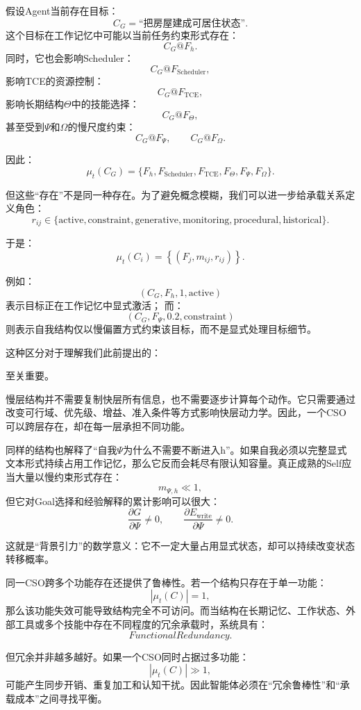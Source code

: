 假设Agent当前存在目标：
\[
C_G=\text{“把房屋建成可居住状态”}.
\]
这个目标在工作记忆中可能以当前任务约束形式存在：
\[
C_G@F_h.
\]
同时，它也会影响Scheduler：
\[
C_G@F_{\text{Scheduler}},
\]
影响TCE的资源控制：
\[
C_G@F_{\text{TCE}},
\]
影响长期结构$\Theta$中的技能选择：
\[
C_G@F_\Theta,
\]
甚至受到$\Psi$和$\Omega$的慢尺度约束：
\[
C_G@F_\Psi,
\qquad
C_G@F_\Omega.
\]

因此：
\[
\mu_t(C_G)
=
\{
F_h,
F_{\text{Scheduler}},
F_{\text{TCE}},
F_\Theta,
F_\Psi,
F_\Omega
\}.
\]

但这些“存在”不是同一种存在。为了避免概念模糊，我们可以进一步给承载关系定义角色：
\[
r_{ij}
\in
\{
\text{active},
\text{constraint},
\text{generative},
\text{monitoring},
\text{procedural},
\text{historical}
\}.
\]

于是：
\[
\mu_t(C_i)
=
\left\{
(F_j,m_{ij},r_{ij})
\right\}.
\]

例如：
\[
(C_G,F_h,1,\text{active})
\]
表示目标正在工作记忆中显式激活；
而：
\[
(C_G,F_\Psi,0.2,\text{constraint})
\]
则表示自我结构仅以慢偏置方式约束该目标，而不是显式处理目标细节。

这种区分对于理解我们此前提出的：
\begin{statementbox}
\centering
{}
\end{statementbox}
至关重要。

慢层结构并不需要复制快层所有信息，也不需要逐步计算每个动作。它只需要通过改变可行域、优先级、增益、准入条件等方式影响快层动力学。因此，一个CSO可以跨层存在，却在每一层承担不同功能。

同样的结构也解释了“自我$\Psi$为什么不需要不断进入h”。如果自我必须以完整显式文本形式持续占用工作记忆，那么它反而会耗尽有限认知容量。真正成熟的Self应当大量以慢约束形式存在：
\[
m_{\Psi,h}\ll1,
\]
但它对Goal选择和经验解释的累计影响可以很大：
\[
\frac{\partial G}{\partial\Psi}\neq0,
\qquad
\frac{\partial E_{\text{write}}}{\partial\Psi}\neq0.
\]

这就是“背景引力”的数学意义：它不一定大量占用显式状态，却可以持续改变状态转移概率。

同一CSO跨多个功能存在还提供了鲁棒性。若一个结构只存在于单一功能：
\[
|\mu_t(C)|=1,
\]
那么该功能失效可能导致结构完全不可访问。而当结构在长期记忆、工作状态、外部工具或多个技能中存在不同程度的冗余承载时，系统具有：
\[
FunctionalRedundancy.
\]

但冗余并非越多越好。如果一个CSO同时占据过多功能：
\[
|\mu_t(C)|\gg1,
\]
可能产生同步开销、重复加工和认知干扰。因此智能体必须在“冗余鲁棒性”和“承载成本”之间寻找平衡。


